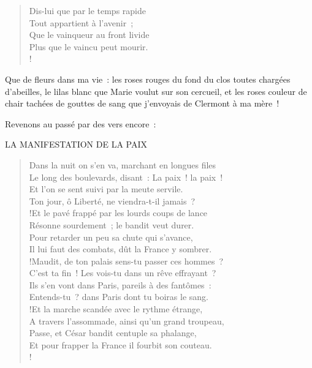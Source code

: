 \documentclass[french,twoside]{book} %
\newenvironment{quoteblock}%
  {\begin{quoting}}
  {\end{quoting}}
\newenvironment{quotebar}{%
    \def\FrameCommand{{\color{rubric!10!}\vrule width 0.5em} \hspace{0.9em}}%
    \def\OuterFrameSep{\itemsep} %
    \MakeFramed {\advance\hsize-\width \FrameRestore}
  }%
  {%
    \endMakeFramed
  }
\renewenvironment{quoteblock}%
  {%
    \savenotes
    \setstretch{0.9}
    \normalfont
    \begin{quotebar}
  }
  {%
    \end{quotebar}
    \spewnotes
  }
\begin{document}
\begin{verse}
Dis-lui que par le temps rapide\\
Tout appartient à l’avenir ;\\
Que le vainqueur au front livide\\
Plus que le vaincu peut mourir.\\!
\end{verse}

\noindent Que de fleurs dans ma vie : les roses rouges du fond du clos toutes chargées d’abeilles, le lilas blanc que Marie voulut sur son cercueil, et les roses couleur de chair tachées de gouttes de sang que j’envoyais de Clermont à ma mère !\par
Revenons au passé par des vers encore :\par

\begin{quoteblock}
LA MANIFESTATION DE LA PAIX\end{quoteblock}

\begin{verse}
Dans la nuit on s’en va, marchant en longues files\\
Le long des boulevards, disant : La paix ! la paix !\\
Et l’on se sent suivi par la meute servile.\\
Ton jour, ô Liberté, ne viendra-t-il jamais ?\\!Et le pavé frappé par les lourds coups de lance\\
Résonne sourdement ; le bandit veut durer.\\
Pour retarder un peu sa chute qui s’avance,\\
Il lui faut des combats, dût la France y sombrer.\\!Maudit, de ton palais sens-tu passer ces hommes ?\\
C’est ta fin ! Les vois-tu dans un rêve effrayant ?\\
Ils s’en vont dans Paris, pareils à des fantômes :\\
Entends-tu ? dans Paris dont tu boiras le sang.\\!Et la marche scandée avec le rythme étrange,\\
A travers l’assommade, ainsi qu’un grand troupeau,\\
Passe, et César bandit centuple sa phalange,\\
Et pour frapper la France il fourbit son couteau.\\!
\end{verse}
\begin{quoteblock}
 \end{quoteblock}
\end{document}
